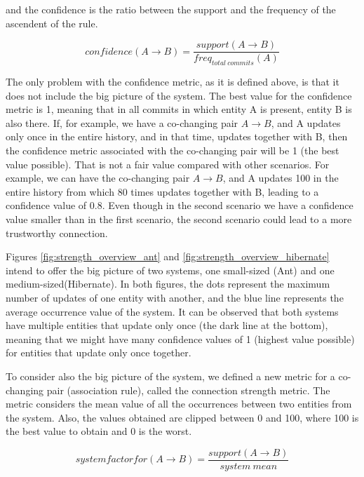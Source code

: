 \documentclass[runningheads]{comsis2}
\begin{document}
and the confidence is the ratio between the support and the frequency of the ascendent of the rule.

\begin{equation}
confidence (A \rightarrow B) =\frac{support (A \rightarrow B) }{freq_{total\ commits}(A)}
\end{equation}


The only problem with the confidence metric, as it is defined above, is that it does not include the big picture of the system.
The best value for the confidence metric is 1, meaning that in all commits in which entity A is present, entity B is also there. If, for example, we have a co-changing pair $A \rightarrow B$, and A updates only once in the entire history, and in that time, updates together with B, then the confidence metric associated with the co-changing pair will be 1 (the best value possible). That is not a fair value compared with other scenarios. For example, we can have the co-changing pair $A \rightarrow B$, and A updates 100 in the entire history from which 80 times updates together with B, leading to a confidence value of 0.8.
Even though in the second scenario we have a confidence value smaller than in the first scenario, the second scenario could lead to a more trustworthy connection.


Figures \ref{fig:strength_overview_ant} and \ref{fig:strength_overview_hibernate}  intend to offer the big picture of two systems, one small-sized (Ant) and one medium-sized(Hibernate). In both figures, the dots represent the maximum number of updates of one entity with another, and the blue line represents the average occurrence value of the system.
It can be observed that both systems have multiple entities that update only once (the dark line at the bottom), meaning that we might have many confidence values of 1 (highest value possible) for entities that update only once together.


To consider also the big picture of the system, we defined a new metric for a co-changing pair (association rule), called the connection strength metric. The metric considers the mean value of all the occurrences between two entities from the system. Also, the values obtained are clipped between 0 and 100, where 100 is the best value to obtain and 0 is the worst.

\begin{equation}
 system factor for (A \rightarrow B) =\frac{support (A \rightarrow B) }{system\ mean}
\end{equation}
\end{document}
